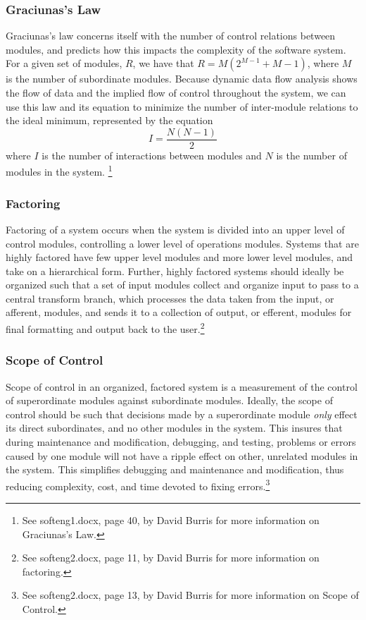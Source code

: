 \documentclass{article}
\begin{document}
		\subsubsection{Graciunas's Law}
			Graciunas's law concerns itself with the number of control relations between modules, and predicts how this impacts the complexity of the software system. For a given set of modules, $R$, we have that $R = M(2^{M-1} + M - 1)$, where $M$ is the number of subordinate modules. Because dynamic data flow analysis shows the flow of data and the implied flow of control throughout the system, we can use this law and its equation to minimize the number of inter-module relations to the ideal minimum, represented by the equation 
			$$I = \frac{N(N - 1)}{2}$$
			where $I$ is the number of interactions between modules and $N$ is the number of modules in the system. \footnote{See softeng1.docx, page 40, by David Burris for more information on Graciunas's Law.}
		\subsubsection{Factoring}
			Factoring of a system occurs when the system is divided into an upper level of control modules, controlling a lower level of operations modules. Systems that are highly factored have few upper level modules and more lower level modules, and take on a hierarchical form. Further, highly factored systems should ideally be organized such that a set of input modules collect and organize input to pass to a central transform branch, which processes the data taken from the input, or afferent, modules, and sends it to a collection of output, or efferent, modules for final formatting and output back to the user.\footnote{See softeng2.docx, page 11, by David Burris for more information on factoring.} 
		\subsubsection{Scope of Control}
			Scope of control in an organized, factored system is a measurement of the control of superordinate modules against subordinate modules. Ideally, the scope of control should be such that decisions made by a superordinate module \emph{only} effect its direct subordinates, and no other modules in the system. This insures that during maintenance and modification, debugging, and testing, problems or errors caused by one module will not have a ripple effect on other, unrelated modules in the system. This simplifies debugging and maintenance and modification, thus reducing complexity, cost, and time devoted to fixing errors.\footnote{See softeng2.docx, page 13, by David Burris for more information on Scope of Control.}  
\end{document}
